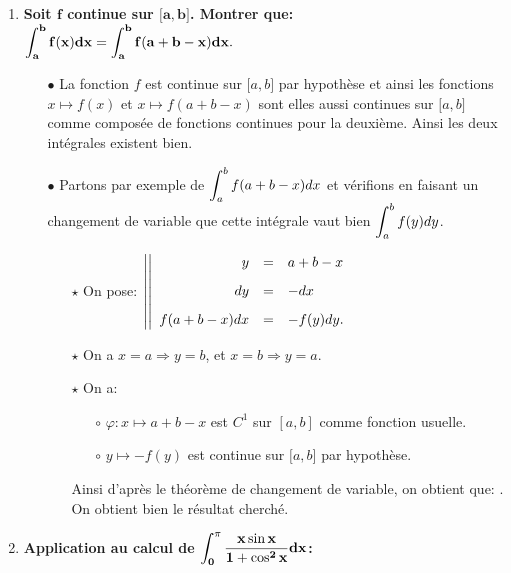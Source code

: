 \documentclass[a4paper, 11pt,reqno]{article}
\begin{document}
\begin{correction}  \;
	\begin{enumerate}
		\item \textbf{Soit $\mathbf{f}$ continue sur $\mathbf{\lbrack a,b\rbrack}$. Montrer que: $\mathbf{ \displaystyle \int_a^b f(x)dx=\int_a^b f(a+b-x)dx.}$}
		      \begin{itemize}
			      \item[$\bullet$] La fonction $f$ est continue sur $\lbrack a,b\rbrack$ par hypoth\`{e}se et ainsi les fonctions $x\mapsto f(x)$ et $x\mapsto f(a+b-x)$ sont elles aussi continues sur $\lbrack a,b\rbrack$ comme compos\'ee de fonctions continues pour la deuxi\`{e}me. Ainsi les deux int\'egrales existent bien.
			      \item[$\bullet$] Partons par exemple de $ \displaystyle \int_a^b f(a+b-x)dx$ et v\'erifions en faisant un changement de variable que cette int\'egrale vaut bien $ \displaystyle \int_a^b f(y)dy$.
			            \begin{itemize}
				            \item[$\star$] On pose: $\left| \left|\begin{array}{rll}
						                  y            & = & a+b-x\vsec \\
						                  dy           & = & -dx \vsec  \\
						                  f(a+b-x)  dx & = & -f(y)dy.
					                  \end{array}\right.\right.$
				            \item[$\star$] On a $x=a \Rightarrow y=b$, et $x=b \Rightarrow y = a$.
				            \item[$\star$] On a:
				                  \begin{itemize}
					                  \item[$\circ$] $\varphi: x\mapsto a+b-x$ est $C^1$ sur $\left\lbrack a,b \right\rbrack$ comme fonction usuelle.
					                  \item[$\circ$] $y\mapsto -f(y)$ est continue sur $\lbrack a,b\rbrack$ par hypoth\`{e}se.
				                  \end{itemize}
				                  Ainsi d'apr\`{e}s le th\'eor\`{e}me de changement de variable, on obtient que:
				                  . On obtient bien le r\'esultat cherch\'e.
			            \end{itemize}
		      \end{itemize}
		\item \textbf{Application au calcul de $\mathbf{ \displaystyle \int_0^\pi \displaystyle\frac{x\sin{x}}{1+\cos^2{x}} dx}$:}\\

\end{enumerate}
\end{correction}
\end{document}
